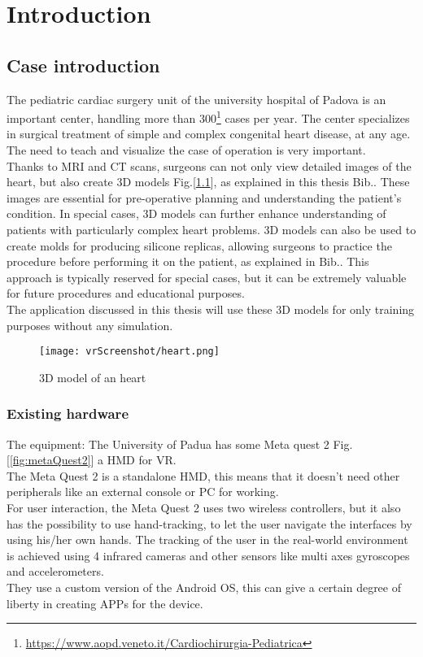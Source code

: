 
\chapter{Introduction}
\label{chp:intro}

\section{Case introduction}
\noindent
The pediatric cardiac surgery unit of the university hospital of Padova is an important center, handling more than 300\footnote{\url{https://www.aopd.veneto.it/Cardiochirurgia-Pediatrica}} cases per year. The center specializes in surgical treatment of simple and complex congenital heart disease, at any age.
The need to teach and visualize the case of operation is very important. \\
Thanks to \ac{MRI} and \ac{CT} scans, surgeons can not only view detailed images of the heart, but also create 3D models Fig.[\ref{fig:heart}], as explained in this thesis Bib.\cite{thesisFrancesco}. These images are essential for pre-operative planning and understanding the patient's condition.
In special cases, 3D models can further enhance understanding of patients with particularly complex heart problems.
3D models can also be used to create molds for producing silicone replicas, allowing surgeons to practice the procedure before performing it on the patient, as explained in Bib.\cite{thesisFabio}.
This approach is typically reserved for special cases, but it can be extremely valuable for future procedures and educational purposes.\\
The application discussed in this thesis will use these 3D models for only training purposes without any simulation.\\

\begin{figure}[ht]
  \centering
  \texttt{[image: vrScreenshot/heart.png]}
  \caption{3D model of an heart}
  \label{fig:heart}
\end{figure}
\subsection{Existing hardware}

The equipment: The University of Padua has some Meta quest 2 Fig.[\ref{fig:metaQuest2}] a \ac{HMD} for \ac{VR}.\\ 
The Meta Quest 2 is a standalone \ac{HMD}, this means that it doesn't need other peripherals like an external console or \ac{PC} for working.\\
For user interaction, the Meta Quest 2 uses two wireless controllers, but it also has the possibility to use hand-tracking, to let the user navigate the interfaces by using his/her own hands.
The tracking of the user in the real-world environment is achieved using 4 infrared cameras and other sensors like multi axes gyroscopes and accelerometers.\\
They use a custom version of the Android \ac{OS}, this can give a certain degree of liberty in creating APPs for the device.

